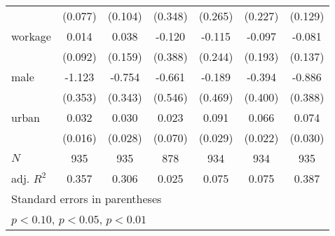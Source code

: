 {\begin{tabular}{l*{6}{c}}
            &     (0.077)         &     (0.104)         &     (0.348)         &     (0.265)         &     (0.227)         &     (0.129)         \\
[1em]
workage     &       0.014         &       0.038         &      -0.120         &      -0.115         &      -0.097         &      -0.081         \\
            &     (0.092)         &     (0.159)         &     (0.388)         &     (0.244)         &     (0.193)         &     (0.137)         \\
[1em]
male        &      -1.123\sym{***}&      -0.754\sym{**} &      -0.661         &      -0.189         &      -0.394         &      -0.886\sym{**} \\
            &     (0.353)         &     (0.343)         &     (0.546)         &     (0.469)         &     (0.400)         &     (0.388)         \\
[1em]
urban       &       0.032\sym{*}  &       0.030         &       0.023         &       0.091\sym{***}&       0.066\sym{***}&       0.074\sym{**} \\
            &     (0.016)         &     (0.028)         &     (0.070)         &     (0.029)         &     (0.022)         &     (0.030)         \\
\hline
\(N\)       &         935         &         935         &         878         &         934         &         934         &         935         \\
adj. \(R^{2}\)&       0.357         &       0.306         &       0.025         &       0.075         &       0.075         &       0.387         \\
\hline\hline
\multicolumn{7}{l}{\footnotesize Standard errors in parentheses}\\
\multicolumn{7}{l}{\footnotesize \sym{*} \(p<0.10\), \sym{**} \(p<0.05\), \sym{***} \(p<0.01\)}\\
\end{tabular}
}

